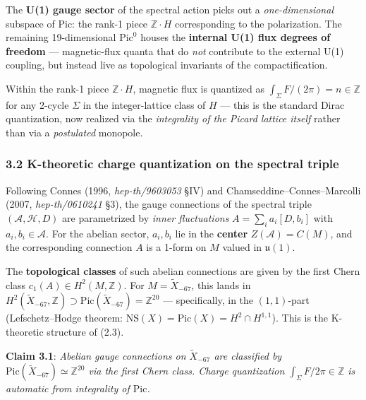 \documentclass[
  11pt,
  a4paper,
]{article}
\begin{document}
The \textbf{U(1) gauge sector} of the spectral action picks out a \emph{one-dimensional} subspace of \(\mathrm{Pic}\): the rank-1 piece \(\mathbb Z \cdot H\) corresponding to the polarization. The remaining 19-dimensional \(\mathrm{Pic}^0\) houses the \textbf{internal U(1) flux degrees of freedom} --- magnetic-flux quanta that do \emph{not} contribute to the external U(1) coupling, but instead live as topological invariants of the compactification.

Within the rank-1 piece \(\mathbb Z \cdot H\), magnetic flux is quantized as \(\int_\Sigma F/(2\pi) = n \in \mathbb Z\) for any 2-cycle \(\Sigma\) in the integer-lattice class of \(H\) --- this is the standard Dirac quantization, now realized via the \emph{integrality of the Picard lattice itself} rather than via a \emph{postulated} monopole.

\hypertarget{k-theoretic-charge-quantization-on-the-spectral-triple}{%
\subsubsection{3.2 K-theoretic charge quantization on the spectral triple}\label{k-theoretic-charge-quantization-on-the-spectral-triple}}

Following Connes (1996, \emph{hep-th/9603053} §IV) and Chamseddine--Connes--Marcolli (2007, \emph{hep-th/0610241} §3), the gauge connections of the spectral triple \((\mathcal A, \mathcal H, D)\) are parametrized by \emph{inner fluctuations} \(A = \sum_i a_i [D, b_i]\) with \(a_i, b_i \in \mathcal A\). For the abelian sector, \(a_i, b_i\) lie in the \textbf{center} \(Z(\mathcal A) = C(M)\), and the corresponding connection \(A\) is a 1-form on \(M\) valued in \(\mathfrak u(1)\).

The \textbf{topological classes} of such abelian connections are given by the first Chern class \(c_1(A) \in H^2(M, \mathbb Z)\). For \(M = \tilde X_{-67}\), this lands in \(H^2(\tilde X_{-67}, \mathbb Z) \supset \mathrm{Pic}(\tilde X_{-67}) = \mathbb Z^{20}\) --- specifically, in the \((1,1)\)-part (Lefschetz--Hodge theorem: \(\mathrm{NS}(X) = \mathrm{Pic}(X) = H^2 \cap H^{1,1}\)). This is the K-theoretic structure of (2.3).

\textbf{Claim 3.1}: \emph{Abelian gauge connections on \(\tilde X_{-67}\) are classified by \(\mathrm{Pic}(\tilde X_{-67}) \simeq \mathbb Z^{20}\) via the first Chern class. Charge quantization \(\int_\Sigma F / 2\pi \in \mathbb Z\) is automatic from integrality of \(\mathrm{Pic}\).}
\end{document}
